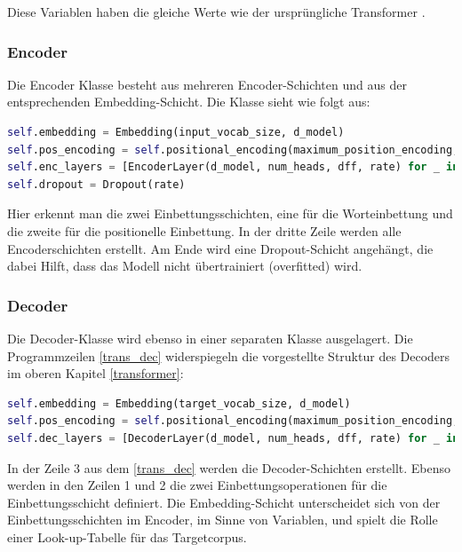 Diese Variablen haben die gleiche Werte wie der ursprüngliche Transformer \cite{Vaswani:2017}.

\subsubsection{Encoder}

Die Encoder Klasse besteht aus mehreren Encoder-Schichten und aus der entsprechenden Embedding-Schicht. Die Klasse sieht wie folgt aus:

\begin{lstlisting}[language=Python, caption={Encoder}, label={Transformer_Enc_class}]
self.embedding = Embedding(input_vocab_size, d_model)
self.pos_encoding = self.positional_encoding(maximum_position_encoding, self.d_model)
self.enc_layers = [EncoderLayer(d_model, num_heads, dff, rate) for _ in range(self.num_layers)]
self.dropout = Dropout(rate)
\end{lstlisting}

Hier erkennt man die zwei Einbettungsschichten, eine für die Worteinbettung und die zweite für die positionelle Einbettung. In der dritte Zeile werden alle Encoderschichten erstellt. Am Ende wird eine Dropout-Schicht angehängt, die dabei Hilft, dass das Modell nicht übertrainiert (overfitted) wird.

\subsubsection{Decoder}

Die Decoder-Klasse wird ebenso in einer separaten Klasse ausgelagert. Die Programmzeilen \ref{trans_dec} widerspiegeln die vorgestellte Struktur des Decoders im oberen Kapitel \ref{transformer}: 

\begin{lstlisting}[language=Python, caption={Decoder Implementation}, label=trans_dec]
self.embedding = Embedding(target_vocab_size, d_model)
self.pos_encoding = self.positional_encoding(maximum_position_encoding, d_model)
self.dec_layers = [DecoderLayer(d_model, num_heads, dff, rate) for _ in range(num_layers)]
\end{lstlisting}

In der Zeile 3 aus dem \cref{trans_dec} werden die Decoder-Schichten erstellt. Ebenso werden in den Zeilen 1 und 2 die zwei Einbettungsoperationen für die Einbettungsschicht definiert. Die Embedding-Schicht unterscheidet sich von der Einbettungsschichten im Encoder, im Sinne von Variablen, und spielt die Rolle einer Look-up-Tabelle für das Targetcorpus.

